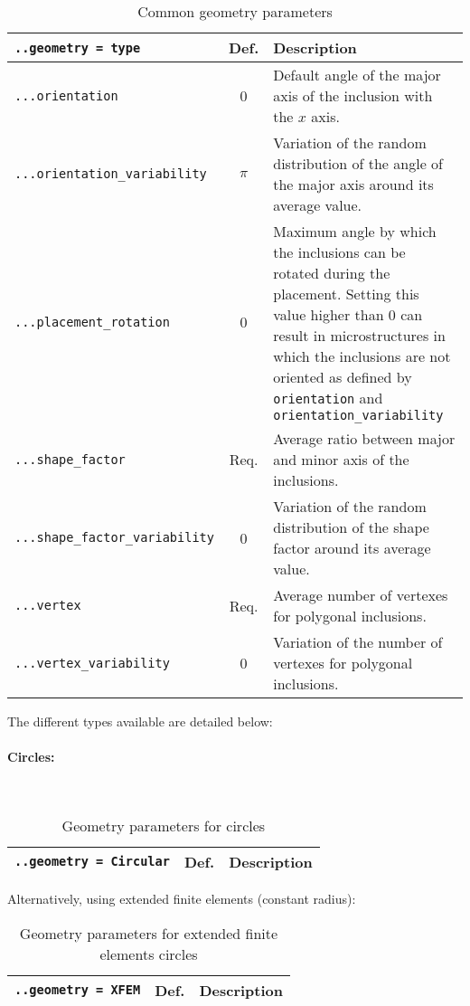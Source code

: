 \documentclass[10pt]{article}
\newcommand{\whiteline}{\textcolor{white}{.\\}}
\begin{document}
\begin{table}[h!]
\begin{tabularx}{\textwidth}{lcX}
\verb+..geometry = type+ & Def. & Description\\
\hline
\verb+...orientation+ & 0 & Default angle of the major axis of the inclusion with the $x$ axis.\\
\verb+...orientation_variability+ & $\pi$ & Variation of the random distribution of the angle of the major axis around its average value.\\
\verb+...placement_rotation+ & 0 & Maximum angle by which the inclusions can be rotated during the placement. Setting this value higher than 0 can result in microstructures in which the inclusions are not oriented as defined by \verb+orientation+ and \verb+orientation_variability+\\
\verb+...shape_factor+ &  Req. & Average ratio between major and minor axis of the inclusions.\\
\verb+...shape_factor_variability+ & 0 & Variation of the random distribution of the shape factor around its average value.\\
\verb+...vertex+ &  Req. & Average number of vertexes for polygonal inclusions.\\
\verb+...vertex_variability+ & 0 & Variation of the number of vertexes for polygonal inclusions.\\
\hline
\end{tabularx}
\caption{Common geometry parameters}
\end{table}

The different types available are detailed below:

\eject

\paragraph{Circles:} \whiteline

\begin{table}[h!]
\begin{tabularx}{\textwidth}{lcX}
\verb+..geometry = Circular+ & Def. & Description\\
\hline
\end{tabularx}
\caption{Geometry parameters for circles}
\end{table}

Alternatively, using extended finite elements (constant radius):

\begin{table}[h!]
\begin{tabularx}{\textwidth}{lcX}
\verb+..geometry = XFEM+ & Def. & Description\\
\hline
\end{tabularx}
\caption{Geometry parameters for extended finite elements circles}
\end{table}
\end{document}
